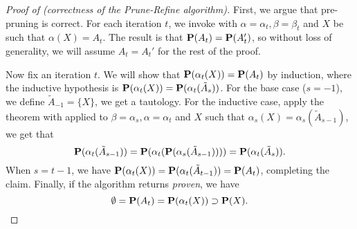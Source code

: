 \begin{proof}[Proof of  (correctness of the Prune-Refine algorithm)]
First, we argue that pre-pruning is correct.
For each iteration $t$, we invoke  with $\alpha = \alpha_t,
\beta = \beta_t$ and $X$ be such that $\alpha(X) = A_t$.
The result is that $\mathbf{P}(A_t) = \mathbf{P}(A_t')$, so without loss of generality,
we will assume $A_t = A_t'$ for the rest of the proof.

Now fix an iteration $t$.
We will show that $\mathbf{P}(\alpha_t(X)) = \mathbf{P}(A_t)$ by induction,
where the inductive hypothesis is $\mathbf{P}(\alpha_t(X)) = \mathbf{P}(\alpha_t(\tilde A_s))$.
For the base case ($s = -1$), we define $\tilde A_{-1} = \{X\}$, we get a tautology.
For the inductive case, apply the theorem with 
applied to $\beta = \alpha_s, \alpha = \alpha_t$ and $X$ such that $\alpha_s(X) = \alpha_s(\tilde A_{s-1})$,
we get that 
\[ \mathbf{P}(\alpha_t(\tilde A_{s-1})) = \mathbf{P}(\alpha_t(\mathbf{P}(\alpha_s(\tilde A_{s-1})))) = \mathbf{P}(\alpha_t(\tilde A_s)). \]
When $s = t-1$, we have $\mathbf{P}(\alpha_t(X)) = \mathbf{P}(\alpha_t(\tilde A_{t-1})) = \mathbf{P}(A_t)$,
completing the claim.
Finally, if the algorithm returns {\em proven}, we have
\[ \emptyset = \mathbf{P}(A_t) = \mathbf{P}(\alpha_t(X)) \supset \mathbf{P}(X). \]
\end{proof}
